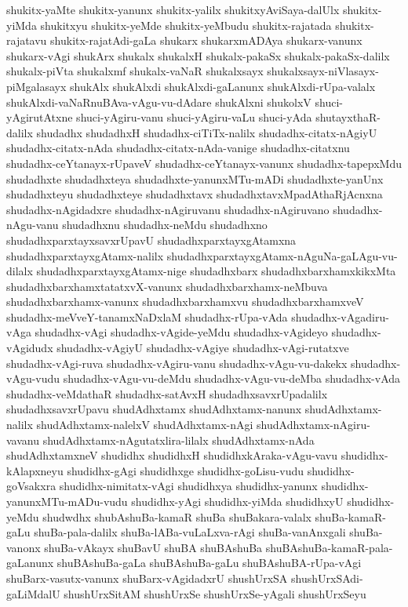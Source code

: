 {shukitx-yaMte
shukitx-yanunx
shukitx-yalilx
shukitxyAviSaya-dalUlx
shukitx-yiMda
shukitxyu
shukitx-yeMde
shukitx-yeMbudu
shukitx-rajatada
shukitx-rajatavu
shukitx-rajatAdi-gaLa
shukarx
shukarxmADAya
shukarx-vanunx
shukarx-vAgi
shukArx
shukalx
shukalxH
shukalx-pakaSx
shukalx-pakaSx-dalilx
shukalx-piVta
shukalxmf
shukalx-vaNaR
shukalxsayx
shukalxsayx-niVlasayx-piMgalasayx
shukAlx
shukAlxdi
shukAlxdi-gaLanunx
shukAlxdi-rUpa-valalx
shukAlxdi-vaNaRnuBAva-vAgu-vu-dAdare
shukAlxni
shukolxV
shuci-yAgirutAtxne
shuci-yAgiru-vanu
shuci-yAgiru-vaLu
shuci-yAda
shutayxthaR-dalilx
shudadhx
shudadhxH
shudadhx-ciTiTx-nalilx
shudadhx-citatx-nAgiyU
shudadhx-citatx-nAda
shudadhx-citatx-nAda-vanige
shudadhx-citatxnu
shudadhx-ceYtanayx-rUpaveV
shudadhx-ceYtanayx-vanunx
shudadhx-tapepxMdu
shudadhxte
shudadhxteya
shudadhxte-yanunxMTu-mADi
shudadhxte-yanUnx
shudadhxteyu
shudadhxteye
shudadhxtavx
shudadhxtavxMpadAthaRjAcnxna
shudadhx-nAgidadxre
shudadhx-nAgiruvanu
shudadhx-nAgiruvano
shudadhx-nAgu-vanu
shudadhxnu
shudadhx-neMdu
shudadhxno
shudadhxparxtayxsavxrUpavU
shudadhxparxtayxgAtamxna
shudadhxparxtayxgAtamx-nalilx
shudadhxparxtayxgAtamx-nAguNa-gaLAgu-vu-dilalx
shudadhxparxtayxgAtamx-nige
shudadhxbarx
shudadhxbarxhamxkikxMta
shudadhxbarxhamxtatatxvX-vanunx
shudadhxbarxhamx-neMbuva
shudadhxbarxhamx-vanunx
shudadhxbarxhamxvu
shudadhxbarxhamxveV
shudadhx-meVveY-tanamxNaDxlaM
shudadhx-rUpa-vAda
shudadhx-vAgadiru-vAga
shudadhx-vAgi
shudadhx-vAgide-yeMdu
shudadhx-vAgideyo
shudadhx-vAgidudx
shudadhx-vAgiyU
shudadhx-vAgiye
shudadhx-vAgi-rutatxve
shudadhx-vAgi-ruva
shudadhx-vAgiru-vanu
shudadhx-vAgu-vu-dakekx
shudadhx-vAgu-vudu
shudadhx-vAgu-vu-deMdu
shudadhx-vAgu-vu-deMba
shudadhx-vAda
shudadhx-veMdathaR
shudadhx-satAvxH
shudadhxsavxrUpadalilx
shudadhxsavxrUpavu
shudAdhxtamx
shudAdhxtamx-nanunx
shudAdhxtamx-nalilx
shudAdhxtamx-nalelxV
shudAdhxtamx-nAgi
shudAdhxtamx-nAgiru-vavanu
shudAdhxtamx-nAgutatxlira-lilalx
shudAdhxtamx-nAda
shudAdhxtamxneV
shudidhx
shudidhxH
shudidhxkAraka-vAgu-vavu
shudidhx-kAlapxneyu
shudidhx-gAgi
shudidhxge
shudidhx-goLisu-vudu
shudidhx-goVsakxra
shudidhx-nimitatx-vAgi
shudidhxya
shudidhx-yanunx
shudidhx-yanunxMTu-mADu-vudu
shudidhx-yAgi
shudidhx-yiMda
shudidhxyU
shudidhx-yeMdu
shudwdhx
shubAshuBa-kamaR
shuBa
shuBakara-valalx
shuBa-kamaR-gaLu
shuBa-pala-dalilx
shuBa-lABa-vuLaLxva-rAgi
shuBa-vanAnxgali
shuBa-vanonx
shuBa-vAkayx
shuBavU
shuBA
shuBAshuBa
shuBAshuBa-kamaR-pala-gaLanunx
shuBAshuBa-gaLa
shuBAshuBa-gaLu
shuBAshuBA-rUpa-vAgi
shuBarx-vasutx-vanunx
shuBarx-vAgidadxrU
shushUrxSA
shushUrxSAdi-gaLiMdalU
shushUrxSitAM
shushUrxSe
shushUrxSe-yAgali
shushUrxSeyu
}
